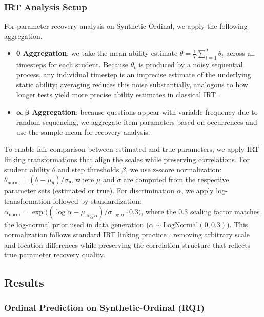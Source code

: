 \documentclass[pdflatex,sn-apa]{sn-jnl}
\begin{document}
\subsubsection{IRT Analysis Setup}
For parameter recovery analysis on Synthetic-Ordinal, we apply the following aggregation.
\begin{itemize}
    \item $\boldsymbol{\theta}$ \textbf{Aggregation}: we take the mean ability estimate $\bar{\theta} = \frac{1}{T}\sum_{t=1}^{T}\theta_t$ across all timesteps for each student. Because $\theta_t$ is produced by a noisy sequential process, any individual timestep is an imprecise estimate of the underlying static ability; averaging reduces this noise substantially, analogous to how longer tests yield more precise ability estimates in classical IRT \citep{embretson_irt_2000}.
    \item $\boldsymbol{\alpha}, \boldsymbol{\beta}$ \textbf{Aggregation}: because questions appear with variable frequency due to random sequencing, we aggregate item parameters based on occurrences and use the sample mean for recovery analysis.
\end{itemize}

To enable fair comparison between estimated and true parameters, we apply IRT linking transformations that align the scales while preserving correlations. For student ability $\theta$ and step thresholds $\beta$, we use z-score normalization: $\theta_{\mathrm{norm}} = (\theta - \mu_\theta) / \sigma_\theta$, where $\mu$ and $\sigma$ are computed from the respective parameter sets (estimated or true). For discrimination $\alpha$, we apply log-transformation followed by standardization: $\alpha_{\mathrm{norm}} = \exp\bigl((\log \alpha - \mu_{\log \alpha}) / \sigma_{\log \alpha} \cdot 0.3\bigr)$, where the 0.3 scaling factor matches the log-normal prior used in data generation ($\alpha \sim \mathrm{LogNormal}(0, 0.3)$). This normalization follows standard IRT linking practice \citep{kolen_test_2014}, removing arbitrary scale and location differences while preserving the correlation structure that reflects true parameter recovery quality.

\subsection{Results}

\subsubsection{Ordinal Prediction on Synthetic-Ordinal (RQ1)}
\end{document}
